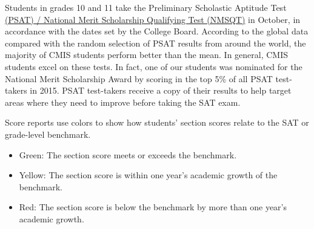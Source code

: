 Students in grades 10 and 11 take the Preliminary Scholastic Aptitude Test\href{https://drive.google.com/drive/folders/0B71\_pYxcTLo-VGNkQlZtTFlIQlE}{ (PSAT) / National Merit Scholarship Qualifying Test (NMSQT)} in October, in accordance with the dates set by the College Board. According to the global data compared with the random selection of PSAT results from around the world, the majority of CMIS students perform better than the mean. In general, CMIS students excel on these tests.  In fact, one of our students was nominated for the National Merit Scholarship Award by scoring in the top 5\% of all PSAT test-takers in 2015.  PSAT test-takers receive a copy of their results to help target areas where they need to improve before taking the SAT exam.  


Score reports use colors to show how students’ section scores relate to the SAT or grade-level benchmark.
\begin{itemize}
\item Green: The section score meets or exceeds the benchmark.
\item Yellow: The section score is within one year’s academic growth of the benchmark.
\item Red: The section score is below the benchmark by more than one year’s academic growth.
\end{itemize}





